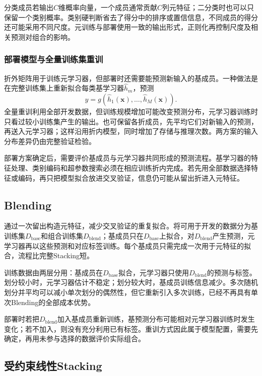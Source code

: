 分类成员若输出$C$维概率向量，一个成员通常贡献$C$列元特征；二分类时也可以只保留一个类别概率。类别硬判断省去了得分中的排序或置信信息，不同成员的得分还可能采用不同尺度。元训练与部署使用一致的输出形式，正则化再控制尺度及相关预测对组合的影响。

\subsubsection{部署模型与全量训练集重训}

折外矩阵用于训练元学习器，但部署时还需要能预测新输入的基成员。一种做法是在完整训练集上重新拟合每类基学习器$\widehat{h}_m$，预测
\[
  \widehat{y}
  =
  g\!\left(
    \widehat{h}_1(\bm{x}),\ldots,\widehat{h}_M(\bm{x})
  \right).
\]
全量重训利用全部开发数据，但训练规模增加可能改变预测分布，元学习器训练时只看过较小训练集产生的输出。也可保留各折成员，先平均它们对新输入的预测，再送入元学习器；这样沿用折内模型，同时增加了存储与推理次数。两方案的输入分布差异仍由完整验证检验。

部署方案确定后，需要评价基成员与元学习器共同形成的预测流程。基学习器的特征处理、类别编码和超参数搜索必须在相应训练折内完成。若先用全部数据选择特征或编码，再只把模型拟合放进交叉验证，信息仍可能从留出折进入元特征。

\subsection{Blending}
\label{sec:ensemble-blending}

通过一次留出构造元特征，减少交叉验证的重复拟合。将可用于开发的数据分为基训练集$D_{\mathrm{base}}$和组合训练集$D_{\mathrm{blend}}$；基成员只在$D_{\mathrm{base}}$上拟合，对$D_{\mathrm{blend}}$产生预测，元学习器再以这些预测和对应标签训练。每个基成员只需完成一次用于元特征的拟合，流程比完整Stacking短。

训练数据由两层分用：基成员在$D_{\mathrm{base}}$拟合，元学习器只使用$D_{\mathrm{blend}}$的预测与标签。划分较小时，元学习器估计不稳定；划分较大时，基成员训练信息减少。多次随机划分并平均可以减小单次划分的偶然性，但它重新引入多次训练，已经不再具有单次Blending的全部成本优势。

部署时若把$D_{\mathrm{blend}}$加入基成员重新训练，基预测分布可能相对元学习器训练时发生变化；若不加入，则没有充分利用已有标签。重训方式因此属于模型配置，需要先确定，再用未参与选择的数据评价实际组合。

\subsection{受约束线性Stacking}
\label{sec:ensemble-constrained-linear-stacking}

